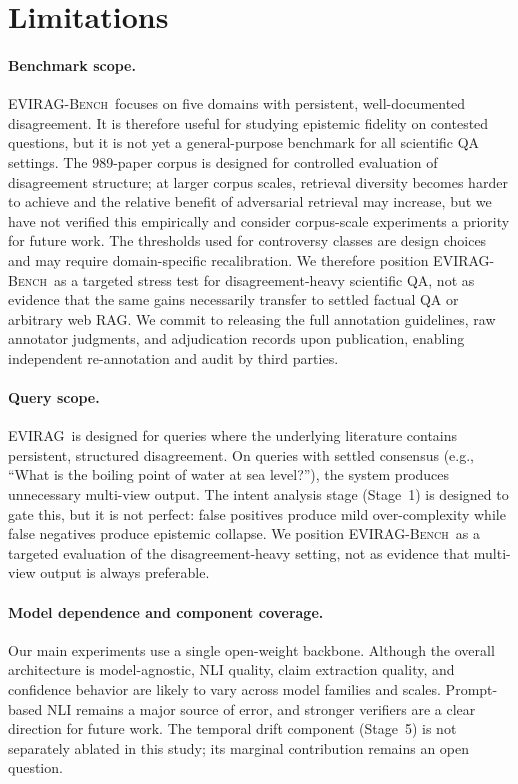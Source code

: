 \documentclass[11pt]{article}
\newcommand{\system}{\textsc{EVIRAG}\xspace}
\newcommand{\bench}{\textsc{EVIRAG-Bench}\xspace}
\begin{document}
\section{Limitations}
\label{sec:limits}

\paragraph{Benchmark scope.}
\bench\ focuses on five domains with persistent, well-documented disagreement.
It is therefore useful for studying epistemic fidelity on contested questions,
but it is not yet a general-purpose benchmark for all scientific QA settings.
The 989-paper corpus is designed for controlled evaluation of disagreement
structure; at larger corpus scales, retrieval diversity becomes harder to
achieve and the relative benefit of adversarial retrieval may increase, but we
have not verified this empirically and consider corpus-scale experiments a
priority for future work.
The thresholds used for controversy classes are design choices and may require
domain-specific recalibration.  We therefore position \bench\ as a targeted
stress test for disagreement-heavy scientific QA, not as evidence that the same
gains necessarily transfer to settled factual QA or arbitrary web RAG.
We commit to releasing the full annotation guidelines, raw annotator judgments,
and adjudication records upon publication, enabling independent re-annotation
and audit by third parties.

\paragraph{Query scope.}
\system\ is designed for queries where the underlying literature contains
persistent, structured disagreement.  On queries with settled consensus
(e.g., ``What is the boiling point of water at sea level?''), the system
produces unnecessary multi-view output.  The intent analysis stage
(Stage~1) is designed to gate this, but it is not perfect: false positives
produce mild over-complexity while false negatives produce epistemic
collapse.  We position \bench\ as a targeted evaluation of the
disagreement-heavy setting, not as evidence that multi-view output is
always preferable.

\paragraph{Model dependence and component coverage.}
Our main experiments use a single open-weight backbone.  Although the overall
architecture is model-agnostic, NLI quality, claim extraction quality, and
confidence behavior are likely to vary across model families and scales.
Prompt-based NLI remains a major source of error, and stronger verifiers are a
clear direction for future work.  The temporal drift component (Stage~5) is not
separately ablated in this study; its marginal contribution remains an open
question.
\end{document}
